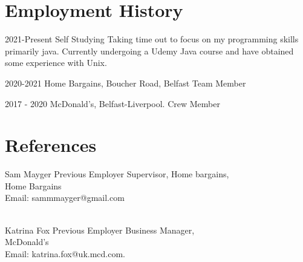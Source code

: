 \documentclass[]{friggeri-cv}
\begin{document}
\section{Employment History}

\begin{entrylist}
	
	\entry
	{2021-Present}
	{Self Studying}
	{ }
	{Taking time out to focus on my programming skills primarily java. Currently undergoing a Udemy Java course and have obtained some experience with Unix.}
	
	\entry
	{2020-2021}
	{Home Bargains, Boucher Road, Belfast}
	{Team Member}
	
	\entry
	{2017 - 2020}
	{McDonald's, Belfast-Liverpool.}
	{Crew Member}
	
\end{entrylist}

\section{References}
\begin{entrylist}
	\entry
	{}
	{Sam Mayger}
	{Previous Employer}
	{Supervisor, Home bargains, \\ Home Bargains \\  Email: sammmayger@gmail.com}

	\\
	\entry
		{}
	{Katrina Fox}
	{Previous Employer}
	{Business Manager, \\ McDonald's \\ Email: katrina.fox@uk.mcd.com.}
\end{entrylist}
\end{document}
